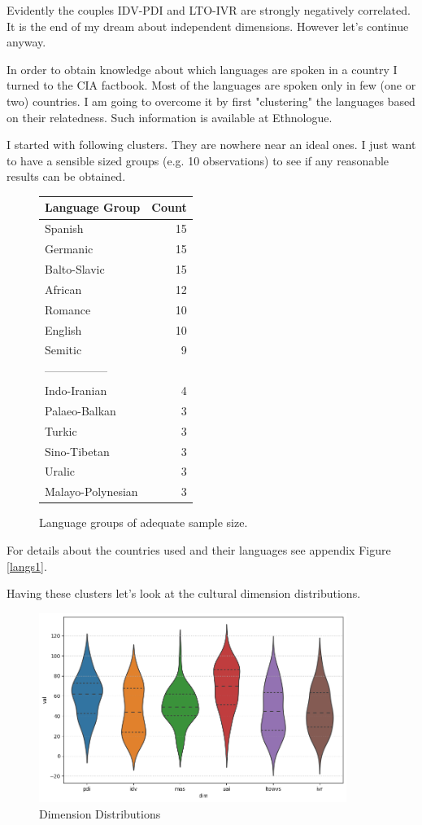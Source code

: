 \documentclass[a4paper,10pt]{article}
\begin{document}
Evidently the couples IDV-PDI and LTO-IVR are strongly negatively correlated.
It is the end of my dream about independent dimensions.
However let's continue anyway.

In order to obtain knowledge about which languages are spoken in a country I turned to the CIA factbook\cite{ciaFactbook}.
Most of the languages are spoken only in few (one or two) countries.
I am going to overcome it by first "clustering" the languages based on their relatedness.
Such information is available at Ethnologue\cite{ethnologue}.

I started with following clusters.
They are nowhere near an ideal ones.
I just want to have a sensible sized groups (e.g. 10 observations) to see if any reasonable results can be obtained.

\begin{figure}[H]
\begin{longtable}[]{@{}lr@{}}
\toprule
Language Group & Count \\
\midrule
\endhead
Spanish & 15 \\
Germanic & 15 \\
Balto-Slavic & 15 \\
African & 12 \\
Romance & 10 \\
English & 10 \\
Semitic & 9 \\
----------------- & \\
Indo-Iranian & 4 \\
Palaeo-Balkan & 3 \\
Turkic & 3 \\
Sino-Tibetan & 3 \\
Uralic & 3 \\
Malayo-Polynesian & 3 \\
\bottomrule
\end{longtable}
\caption{Language groups of adequate sample size.}
\end{figure}

For details about the countries used and their languages see appendix Figure \ref{langs1}.

Having these clusters let's look at the cultural dimension distributions.

\begin{figure}[H]
       \begin{center}
              \includegraphics[width=10cm]{../figures/dim_distributions.png}
       \end{center}
       \caption{Dimension Distributions}
\end{figure}
\end{document}
